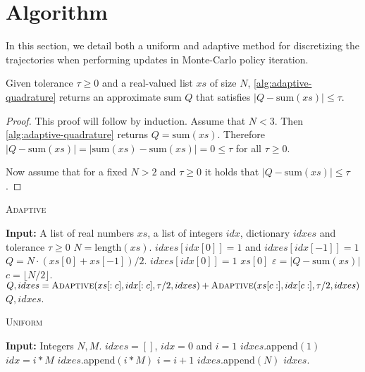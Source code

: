 \section{Algorithm}
In this section, we detail both a uniform and adaptive method for discretizing the trajectories when performing updates in Monte-Carlo policy iteration. 
\begin{proposition}
    Given tolerance $\tau \geq 0$ and a real-valued list $xs$ of size $N$, \cref{alg:adaptive-quadrature} returns an approximate sum $Q$ that satisfies $|Q - \text{sum}(xs)| \leq \tau$.  
\end{proposition}
\begin{proof}
    This proof will follow by induction. Assume that $N < 3$. Then \cref{alg:adaptive-quadrature} returns $Q = \text{sum}(xs)$. Therefore $|Q - \text{sum}(xs)| = |\text{sum}(xs) - \text{sum}(xs)| = 0 \leq \tau$ for all $\tau \geq 0$. 
    
    Now assume that for a fixed $N > 2$ and $\tau \geq 0$ it holds that $|Q - \text{sum}(xs)| \leq \tau$. 
\end{proof}

\begin{algorithm}[t]
    \caption{\textsc{Adaptive}}\label{alg:adaptive-quadrature}
    \begin{algorithmic}
    \State \textbf{Input:} A list of real numbers $xs$, a list of integers $idx$, dictionary $idxes$ and tolerance $\tau \geq 0$
    \State $N = \text{length}(xs)$.
        \State $idxes[idx[0]] = 1$ and $idxes[idx[-1]] = 1$
        \State $Q = N \cdot (xs[0] + xs[-1]) / 2$.
    \Else
        \State $idxes[idx[0]] =1$
        \State \Return $xs[0]$
    \EndIf
    \State $\varepsilon = |Q - \text{sum}(xs)|$
    \If{$\varepsilon \geq \tau$}
        \State $c = \lfloor N / 2 \rfloor$.
        \State $Q, idxes = \textsc{Adaptive}(xs[:c], idx[:c], \tau /2, idxes) + \textsc{Adaptive}(xs[c:], idx[c:], \tau /2, idxes)$
    \EndIf
    \State \Return $Q, idxes$.
    \end{algorithmic}
    \end{algorithm}


    \begin{algorithm}[t]
        \caption{\textsc{Uniform}}\label{alg:uniform}
        \begin{algorithmic}
        \State \textbf{Input:} Integers $N,M$.
        \State $idxes = []$, $idx = 0$ and $i=1$
        \State $idxes$.append$(1)$
        \State $idx = i * M$
        \State $idxes.$append$(i * M)$
        \State $i = i + 1$
        \EndWhile
        \State $idxes$.append$(N)$
        \State \Return $idxes$.
        \end{algorithmic}
        \end{algorithm}



